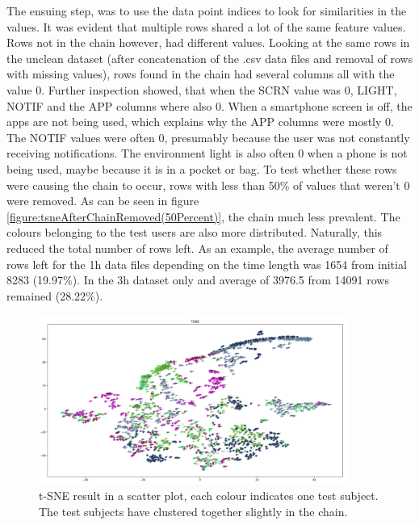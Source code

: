 The ensuing step, was to use the data point indices to look for similarities in the values. It was evident that multiple rows shared a lot of the same feature values. Rows not in the chain however, had different values. Looking at the same rows in the unclean dataset (after concatenation of the .csv data files and removal of rows with missing values), rows found in the chain had several columns all with the value 0. Further inspection showed, that when the SCRN value was 0, LIGHT, NOTIF and the APP columns where also 0. When a smartphone screen is off, the apps are not being used, which explains why the APP columns were mostly 0. The NOTIF values were often 0, presumably because the user was not constantly receiving notifications. The environment light is also often 0 when a phone is not being used, maybe because it is in a pocket or bag. To test whether these rows were causing the chain to occur, rows with less than 50\% of values that weren't 0 were removed. As can be seen in figure \ref{figure:tsneAfterChainRemoved(50Percent)}, the chain much less prevalent. The colours belonging to the test users are also more distributed. Naturally, this reduced the total number of rows left. As an example, the average number of rows left for the 1h data files depending on the time length was 1654 from initial 8283 (19.97\%). In the 3h dataset only and average of 3976.5 from 14091 rows remained (28.22\%).





\begin{figure}[h]
  \centering
  \includegraphics[width=0.9\textwidth]{./images/tsneTestSubjectsColor.png}
  \caption{t-SNE result in a scatter plot, each colour indicates one test subject. The test subjects have clustered together slightly in the chain.}
  \label{figure:tsneTestSubjectsColor}
\end{figure}

